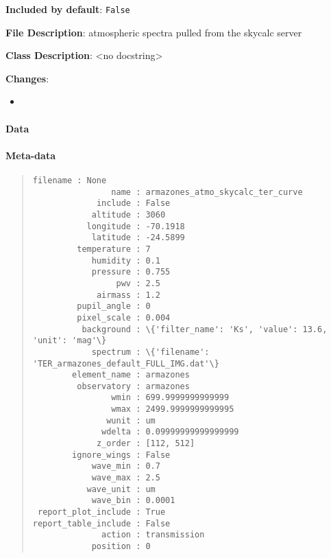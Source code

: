 \textbf{Included by default}: \texttt{False}

\textbf{File Description}: atmospheric spectra pulled from the skycalc server

\textbf{Class Description}: <no docstring>

\textbf{Changes}:

\begin{itemize}
\item \end{itemize}


\paragraph{Data%
  \label{id3}%
}

\begin{figure}[H]
\noindent{}\label{fig-armazones-atmo-skycalc-ter-curve}
\end{figure}


\paragraph{Meta-data%
  \label{id4}%
}

\begin{quote}
\begin{alltt}
\begin{lstlisting}[frame=single]
            filename : None
                name : armazones_atmo_skycalc_ter_curve
             include : False
            altitude : 3060
           longitude : -70.1918
            latitude : -24.5899
         temperature : 7
            humidity : 0.1
            pressure : 0.755
                 pwv : 2.5
             airmass : 1.2
         pupil_angle : 0
         pixel_scale : 0.004
          background : \{'filter_name': 'Ks', 'value': 13.6, 'unit': 'mag'\}
            spectrum : \{'filename': 'TER_armazones_default_FULL_IMG.dat'\}
        element_name : armazones
         observatory : armazones
                wmin : 699.9999999999999
                wmax : 2499.9999999999995
               wunit : um
              wdelta : 0.09999999999999999
             z_order : [112, 512]
        ignore_wings : False
            wave_min : 0.7
            wave_max : 2.5
           wave_unit : um
            wave_bin : 0.0001
 report_plot_include : True
report_table_include : False
              action : transmission
            position : 0
\end{lstlisting}
\end{alltt}
\end{quote}

